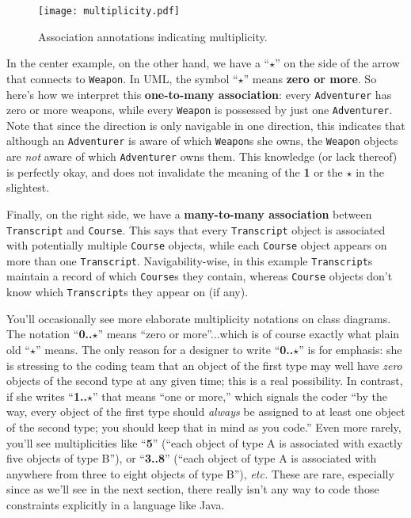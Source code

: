 \begin{figure}[ht]
\centering
\texttt{[image: multiplicity.pdf]}   %
\caption{Association annotations indicating multiplicity.}
\label{fig:multiplicity}
\end{figure}

In the center example, on the other hand, we have a ``$\star$'' on the side of
the arrow that connects to \texttt{Weapon}. In UML, the symbol ``$\star$''
means \textbf{zero or more}. So here's how we interpret this
\textbf{one-to-many association}: every \texttt{Adventurer} has zero or more
weapons, while every \texttt{Weapon} is possessed by just one
\texttt{Adventurer}. Note that since the direction is only navigable in one
direction, this indicates that although an \texttt{Adventurer} is aware of
which \texttt{Weapon}s she owns, the \texttt{Weapon} objects are \textit{not}
aware of which \texttt{Adventurer} owns them. This knowledge (or lack thereof)
is perfectly okay, and does not invalidate the meaning of the \textbf{1} or
the $\star$ in the slightest.

Finally, on the right side, we have a \textbf{many-to-many association}
between \texttt{Tran\-script} and \texttt{Course}. This says that every
\texttt{Transcript} object is associated with potentially multiple
\texttt{Course} objects, while each \texttt{Course} object appears on more
than one \texttt{Transcript}. Navigability-wise, in this example
\texttt{Transcript}s maintain a record of which \texttt{Course}s they contain,
whereas \texttt{Course} objects don't know which \texttt{Transcript}s they
appear on (if any).

You'll occasionally see more elaborate multiplicity notations on class
diagrams. The notation ``\textbf{0..$\star$}'' means ``zero or more''...which is
of course exactly what plain old ``$\star$'' means. The only reason for a
designer to write ``\textbf{0..$\star$}'' is for emphasis: she is stressing to
the coding team that an object of the first type may well have \textit{zero}
objects of the second type at any given time; this is a real possibility. In
contrast, if she writes ``\textbf{1..$\star$}'' that means ``one or more,''
which signals the coder ``by the way, every object of the first type should
\textit{always} be assigned to at least one object of the second type; you
should keep that in mind as you code.'' Even more rarely, you'll see
multiplicities like ``\textbf{5}'' (``each object of type A is associated with
exactly five objects of type B''), or ``\textbf{3..8}'' (``each object of type A
is associated with anywhere from three to eight objects of type B''),
\textit{etc.} These are rare, especially since as we'll see in the next
section, there really isn't any way to code those constraints explicitly in a
language like Java.



